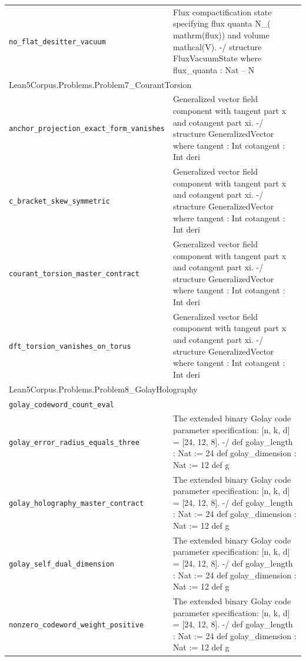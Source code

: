 \begin{longtable}{p{}p{}}
\quad\texttt{\footnotesize no\_flat\_desitter\_vacuum} & {\footnotesize Flux compactification state specifying flux quanta N\_( mathrm(flux)) and volume  mathcal(V). -/ structure FluxVacuumState where flux\_quanta : Nat -- N} \\
\multicolumn{2}{l}{\textsf{\small Lean5Corpus.Problems.Problem7\_CourantTorsion}} \\
\quad\texttt{\footnotesize anchor\_projection\_exact\_form\_vanishes} & {\footnotesize Generalized vector field component with tangent part x and cotangent part  xi. -/ structure GeneralizedVector where tangent : Int cotangent : Int deri} \\
\quad\texttt{\footnotesize c\_bracket\_skew\_symmetric} & {\footnotesize Generalized vector field component with tangent part x and cotangent part  xi. -/ structure GeneralizedVector where tangent : Int cotangent : Int deri} \\
\quad\texttt{\footnotesize courant\_torsion\_master\_contract} & {\footnotesize Generalized vector field component with tangent part x and cotangent part  xi. -/ structure GeneralizedVector where tangent : Int cotangent : Int deri} \\
\quad\texttt{\footnotesize dft\_torsion\_vanishes\_on\_torus} & {\footnotesize Generalized vector field component with tangent part x and cotangent part  xi. -/ structure GeneralizedVector where tangent : Int cotangent : Int deri} \\
\multicolumn{2}{l}{\textsf{\small Lean5Corpus.Problems.Problem8\_GolayHolography}} \\
\quad\texttt{\footnotesize golay\_codeword\_count\_eval} & {\footnotesize } \\
\quad\texttt{\footnotesize golay\_error\_radius\_equals\_three} & {\footnotesize The extended binary Golay code parameter specification: [n, k, d] = [24, 12, 8]. -/ def golay\_length : Nat := 24 def golay\_dimension : Nat := 12 def g} \\
\quad\texttt{\footnotesize golay\_holography\_master\_contract} & {\footnotesize The extended binary Golay code parameter specification: [n, k, d] = [24, 12, 8]. -/ def golay\_length : Nat := 24 def golay\_dimension : Nat := 12 def g} \\
\quad\texttt{\footnotesize golay\_self\_dual\_dimension} & {\footnotesize The extended binary Golay code parameter specification: [n, k, d] = [24, 12, 8]. -/ def golay\_length : Nat := 24 def golay\_dimension : Nat := 12 def g} \\
\quad\texttt{\footnotesize nonzero\_codeword\_weight\_positive} & {\footnotesize The extended binary Golay code parameter specification: [n, k, d] = [24, 12, 8]. -/ def golay\_length : Nat := 24 def golay\_dimension : Nat := 12 def g} \\

\end{longtable}
